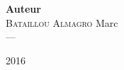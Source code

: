 \begin{titlepage}
\begin{center}
\vfill
{\large
\begin{center}
  {\Large  \hspace{0.5cm} \textbf{Auteur} \hspace{0.5cm}   } \\[0.3cm]
	\textsc{Bataillou Almagro} Marc \\
	  ---
\end{center}
}
\vfill

{\large 2016}

\end{center}
\end{titlepage}